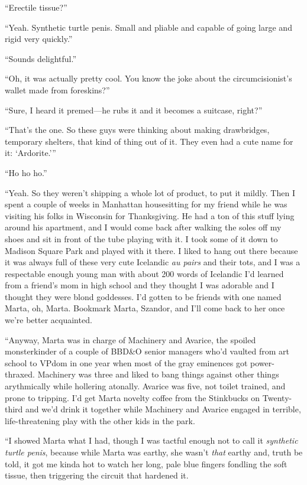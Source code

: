 “Erectile tissue?”

“Yeah. Synthetic turtle penis. Small and pliable and capable of
going large and rigid very quickly.”

“Sounds delightful.”

“Oh, it was actually pretty cool. You know the joke about the
circumcisionist’s wallet made from foreskins?”

“Sure, I heard it premed—he rubs it and it becomes a suitcase,
right?”

“That’s the one. So these guys were thinking about making
drawbridges, temporary shelters, that kind of thing out of it. They
even had a cute name for it: ‘Ardorite.’”

“Ho ho ho.”

“Yeah. So they weren’t shipping a whole lot of product, to put it
mildly. Then I spent a couple of weeks in Manhattan housesitting
for my friend while he was visiting his folks in Wisconsin for
Thanksgiving. He had a ton of this stuff lying around his
apartment, and I would come back after walking the soles off my
shoes and sit in front of the tube playing with it. I took some of
it down to Madison Square Park and played with it there. I liked to
hang out there because it was always full of these very cute
Icelandic \emph{au pairs} and their tots, and I was a respectable
enough young man with about 200 words of Icelandic I’d learned from
a friend’s mom in high school and they thought I was adorable and I
thought they were blond goddesses. I’d gotten to be friends with
one named Marta, oh, Marta. Bookmark Marta, Szandor, and I’ll come
back to her once we’re better acquainted.

“Anyway, Marta was in charge of Machinery and Avarice, the spoiled
monsterkinder of a couple of BBD\&O senior managers who’d vaulted
from art school to VPdom in one year when most of the gray
eminences got power-thraxed. Machinery was three and liked to bang
things against other things arythmically while hollering atonally.
Avarice was five, not toilet trained, and prone to tripping. I’d
get Marta novelty coffee from the Stinkbucks on Twenty-third and
we’d drink it together while Machinery and Avarice engaged in
terrible, life-threatening play with the other kids in the park.

“I showed Marta what I had, though I was tactful enough not to call
it \emph{synthetic turtle penis}, because while Marta was earthy,
she wasn’t \emph{that} earthy and, truth be told, it got me kinda
hot to watch her long, pale blue fingers fondling the soft tissue,
then triggering the circuit that hardened it.

